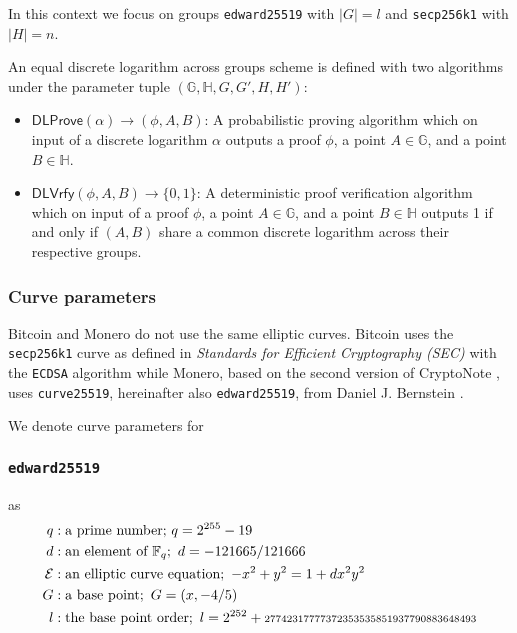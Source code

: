 \documentclass{llncs}
\newcommand{\DLProve}{\textsf{DLProve}}
\newcommand{\DLVrfy}{\textsf{DLVrfy}}
\newcommand{\GG}{\mathbb{G}}
\newcommand{\HH}{\mathbb{H}}
\begin{document}
In this context we focus on groups \texttt{edward25519} with $|G| = l$ and \texttt{secp256k1} with $|H| = n$.

\begin{definition}
    An equal discrete logarithm across groups scheme is defined with two algorithms under the parameter tuple $(\GG,\HH,G,G',H,H')$:
\begin{itemize}
    \item $\DLProve(\alpha) \rightarrow (\phi,A,B)$: A probabilistic proving algorithm which on input of a discrete logarithm $\alpha$ outputs a proof $\phi$, a point $A \in \GG$, and a point $B \in \HH$.
    \item $\DLVrfy(\phi,A,B) \rightarrow \{0,1\}$: A deterministic proof verification algorithm which on input of a proof $\phi$, a point $A \in \GG$, and a point $B \in \HH$ outputs 1 if and only if $(A,B)$ share a common discrete logarithm across their respective groups.
\end{itemize}
\end{definition}

\subsubsection{Curve parameters}
\label{curveParams}
Bitcoin and Monero do not use the same elliptic curves. Bitcoin uses the \texttt{secp256k1} curve as defined in \textit{Standards for Efficient Cryptography (SEC)} with the \texttt{ECDSA} algorithm while Monero, based on the second version of CryptoNote \cite{van2013cryptonote}, uses \texttt{curve25519}, hereinafter also \texttt{edward25519}, from Daniel J. Bernstein \cite{CerRes10}.

We denote curve parameters for

\subsubsection{\texttt{edward25519}} as
\begin{equation}
\begin{split}
    q&: \text{a prime number;}\ q = 2^{255} - 19 \\
    d&: \text{an element of } \mathbb{F}_q;\ d = - 121665/121666 \\
    \mathcal{E}&: \text{an elliptic curve equation};\ -x^2 + y^2 = 1 + dx^2y^2 \\
    G&: \text{a base point};\ G = (x, -4/5) \\
    l&: \text{the base point order};\ l = 2^{252} + \text{\scriptsize27742317777372353535851937790883648493} \\
\end{split}
\end{equation}
\end{document}

